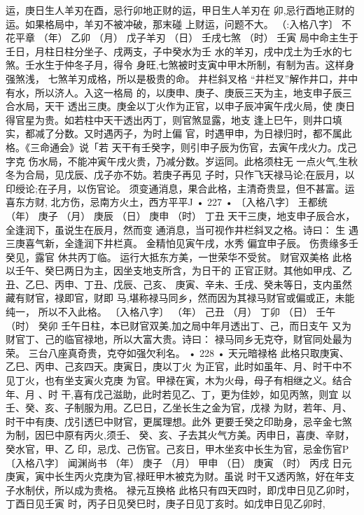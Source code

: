 运，庚日生人羊刃在酉，忌行卯地正财的运，甲日生人羊刃在
卯,忌行酉地正财的运。如果格局中，羊刃不被冲破，那末碰
上财运，问题不大。
（:入格八字〕 不花平章
（年） 乙卯
（月） 戊子羊刃
（日） 壬戌七煞
（时） 壬寅
局中命主生于壬日，月柱日柱分坐子、戌两支，子中癸水为壬
水的羊刃，戌中戊土为壬水的七煞。壬水生于仲冬子月，得令
身旺,七煞被时支寅中甲木所制，有制为吉。这样身强煞浅，
七煞羊刃成格，所以是极贵的命。
井栏斜叉格
“井栏叉”解作井口，井中有水，所以济人。入这一格局
的，以庚申、庚子、庚辰三天为主，地支申子辰三合水局，天干
透出三庚。庚金以丁火作为正官，以申子辰冲寅午戌火局，使
庚日得官星为贵。如若柱中天干透出丙丁，则官煞显露，地支
逢上巳午，则井口填实，都减了分数。又时遇丙子，为时上偏
官，时遇甲申，为日禄归时，都不属此格。《三命通会》说「若
天干有壬癸字，则引申子辰为伤官，去寅午戌火力。戊己字克
伤水局，不能冲寅午戌火贵，乃减分数。岁运同。此格须柱无
一点火气,生秋冬为合局，见戊辰、戊子亦不妨。若庚子再见
子时，只作飞天禄马论;在辰月，以印绶论;在子月，以伤官论。
须变通消息，果合此格，主清奇贵显，但不甚富。运喜东方财,
北方伤，忌南方火土，西方平平J
• 227 •
〔入格八字〕 王都统
（年） 庚子
（月） 庚辰
（日） 庚申
（时） 丁丑
天干三庚，地支申子辰合水，全逢润下，虽说生在辰月，然而变
通消息，当可视作井栏斜叉之格。诗曰：
生 遇三庚喜气新，全逢润下井栏真。
金精怕见寅午戌，水秀 偏宜申子辰。
伤贵缘多壬癸见，露官 休共丙丁临。
运行大抵东方美，一世荣华不受贫。
财官双美格
此格以壬午、癸巳两日为主，因坐支地支所含，为日干的
正官正财。其他如甲戌、乙丑、乙巳、丙申、丁丑、戊辰、己亥、
庚寅、辛未、壬戌、癸未等日，支内虽然藏有财官，禄即官，财即
马,堪称禄马同乡，然而因为其禄马财官或偏或正，未能纯一，
所以不入此格。
〔入格八字〕
（年） 己丑
（月） 丁卯
（日） 壬午
（时） 癸卯
壬午日柱，本已财官双美,加之局中年月透出丁、己，而日支午
又为财官丁、己的临官禄地，所以大富大贵。诗曰：
禄马同乡无克夺，财官同处最为荣。
三台八座真奇贵，克夺如强欠利名。
• 228 •
天元暗禄格
此格只取庚寅、乙巳、丙申、己亥四天。庚寅日，庚以丁火
为正官，此时如虽年、月、时干中不见丁火，也有坐支寅火克庚
为官。甲禄在寅，木为火母，母子有相继之义。结合年、月 、时
干,喜有戊己滋助，此时若见乙、丁，更为佳妙，如见丙煞，则宜
以壬、癸、亥、子制服为用。乙巳日，乙坐长生之金为官，戊禄
为财，若年、月、时干中有庚、戊引透巳中财官，更属理想。此外
更要壬癸之印助身，忌辛金七煞为制，因巳中原有丙火,须壬、
癸、亥、子去其火气方美。丙申日，喜庚、辛财，癸水官，甲、乙
印，忌戊、己伤官。己亥日，甲木坐亥中长生为官，忌金伤官P
〔入格八字〕 闻渊尚书
（年） 庚子
（月） 甲申
（日） 庚寅
（时） 丙戌
日元庚寅，寅中长生丙火克庚为官,禄旺甲木被克为财。虽说
时干又透丙煞，好在年支子水制伏，所以成为贵格。
禄元互换格
此格只有四天四时，即戊申日见乙卯时，丁酉日见壬寅
时，丙子日见癸巳时，庚子日见丁亥时。如戊申日见乙卯时,
